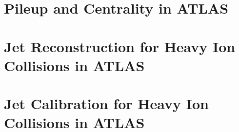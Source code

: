 

\section{Pileup and Centrality in ATLAS}
\label{sec:centrality}


\section{Jet Reconstruction for Heavy Ion Collisions in ATLAS}


\section{Jet Calibration for Heavy Ion Collisions in ATLAS}


